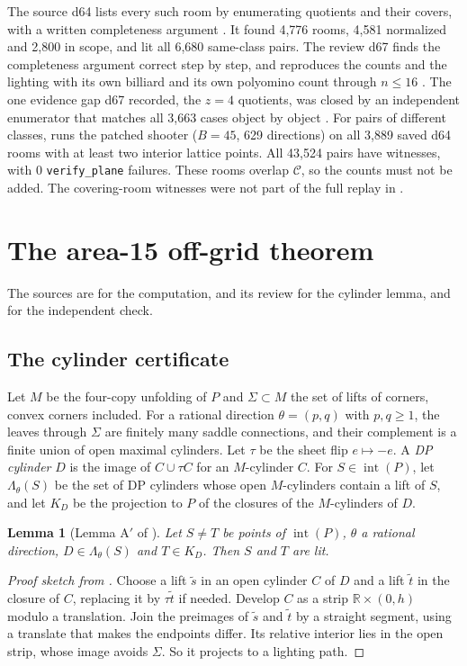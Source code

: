 \documentclass[11pt]{article}
\newtheorem{lemma}{Lemma}
\theoremstyle{definition}
\theoremstyle{remark}
\newcommand{\interior}{\operatorname{int}}
\begin{document}
The source d64 lists every such room by enumerating quotients and their
covers, with a written completeness argument \cite[\S2]{d64}. It found
4{,}776 rooms, 4{,}581 normalized and 2{,}800 in scope, and lit all
6{,}680 same-class pairs. The review d67 finds the completeness argument
correct step by step, and reproduces the counts and the lighting with its
own billiard and its own polyomino count through $n\le16$ \cite{d67}. The
one evidence gap d67 recorded, the $z=4$ quotients, was closed by an
independent enumerator that matches all 3{,}663 cases object by object
\cite{d98}. For pairs of different classes, \cite{qreadme} runs the
patched shooter ($B=45$, 629 directions) on all 3{,}889 saved d64 rooms
with at least two interior lattice points. All 43{,}524 pairs have
witnesses, with 0 \texttt{verify\_plane} failures. These rooms overlap
$\mathcal C$, so the counts must not be added. The covering-room witnesses
were not part of the full replay in \cite{d102}.

\section{The area-15 off-grid theorem}\label{sec:area15}
The sources are \cite{offgrid} for the computation, \cite{d13} and its
review \cite{d96} for the cylinder lemma, and \cite{d74} for the
independent check.

\subsection{The cylinder certificate}
Let $M$ be the four-copy unfolding of $P$ and $\Sigma\subset M$ the set of
lifts of corners, convex corners included. For a rational direction
$\theta=(p,q)$ with $p,q\ge1$, the leaves through $\Sigma$ are finitely
many saddle connections, and their complement is a finite union of open
maximal cylinders. Let $\tau$ be the sheet flip $e\mapsto -e$. A
\emph{DP cylinder} $D$ is the image of $C\cup\tau C$ for an $M$-cylinder
$C$. For $S\in\interior(P)$, let $\Lambda_\theta(S)$ be the set of DP
cylinders whose open $M$-cylinders contain a lift of $S$, and let $K_D$ be
the projection to $P$ of the closures of the $M$-cylinders of $D$.

\begin{lemma}[Lemma A$'$ of \cite{d13}]\label{lem:A}
Let $S\ne T$ be points of $\interior(P)$, $\theta$ a rational direction,
$D\in\Lambda_\theta(S)$ and $T\in K_D$. Then $S$ and $T$ are lit.
\end{lemma}
\begin{proof}[Proof sketch from \cite{d13}]
Choose a lift $\tilde s$ in an open cylinder $C$ of $D$ and a lift
$\tilde t$ in the closure of $C$, replacing it by $\tau\tilde t$ if needed.
Develop $C$ as a strip $\mathbb R\times(0,h)$ modulo a translation. Join
the preimages of $\tilde s$ and $\tilde t$ by a straight segment, using a
translate that makes the endpoints differ. Its relative interior lies in
the open strip, whose image avoids $\Sigma$. So it projects to a lighting
path.
\end{proof}
\end{document}
